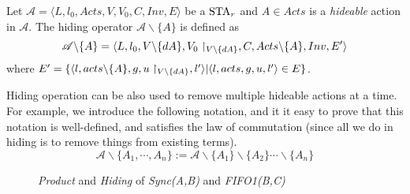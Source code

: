 \begin{definition}[Hiding]
Let $\mathscr{A}= \langle L, l_0, Acts, V, V_0, C, Inv, E\rangle$ be a $\mbox{STA}_r$ and $A\in Acts$ is a \emph{hideable} action in $\mathscr{A}$. The hiding operator $\mathscr{A}\backslash\{A\}$ is defined as
\begin{equation*}
\mathscr{A}\backslash\{A\}
=\langle L, l_0, V\backslash \{dA\}, V_0\restriction_{V\backslash \{dA\}}, C, Acts\backslash\{A\}, Inv, E'\rangle
\end{equation*}
where $E'=\{\langle l, acts\backslash\{A\}, g, u\restriction_{V\backslash \{dA\}}, l'\rangle | \langle l, acts, g, u, l'\rangle\in E\}$.
\end{definition}

Hiding operation can be also used to remove multiple hideable actions at a time. For example, we introduce the following notation, and it it easy to prove that this notation is well-defined, and satisfies the law of commutation (since all we do in hiding is to remove things from existing terms).
\[
    \mathscr{A}\backslash \{A_1,\cdots, A_n\}:=\mathscr{A}\backslash \{A_1\}\backslash\{A_2\}\cdots\backslash \{A_n\}
\]



\begin{figure}[H]
    \centering
    \resizebox{.85\textwidth}{!}{
        
    }
    \caption{\emph{Product} and \emph{Hiding} of \emph{Sync(A,B)} and \emph{FIFO1(B,C)}}
    \label{fig:prodsyncandfifo}
\end{figure}

